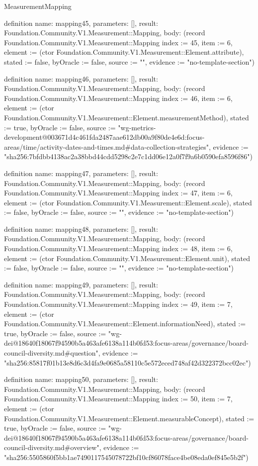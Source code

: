 \begin{lexlean}{MeasurementMapping}
\begin{semanticmodule}
definition{
  name: mapping45,
  parameters: [],
  result: Foundation.Community.V1.Measurement::Mapping,
  body: (record Foundation.Community.V1.Measurement::Mapping {index := 45, item := 6, element := (ctor Foundation.Community.V1.Measurement::Element.attribute), stated := false, byOracle := false, source := "", evidence := "no-template-section"})
}

definition{
  name: mapping46,
  parameters: [],
  result: Foundation.Community.V1.Measurement::Mapping,
  body: (record Foundation.Community.V1.Measurement::Mapping {index := 46, item := 6, element := (ctor Foundation.Community.V1.Measurement::Element.measurementMethod), stated := true, byOracle := false, source := "wg-metrics-development@003671d4c461fda2487aae612db00a9f80de4e6d:focus-areas/time/activity-dates-and-times.md#data-collection-strategies", evidence := "sha256:7bfdbb4138ac2a38bbd44cdd5298c2e7c1dd06e12a0f7f9a6b0590efa8596f86"})
}

definition{
  name: mapping47,
  parameters: [],
  result: Foundation.Community.V1.Measurement::Mapping,
  body: (record Foundation.Community.V1.Measurement::Mapping {index := 47, item := 6, element := (ctor Foundation.Community.V1.Measurement::Element.scale), stated := false, byOracle := false, source := "", evidence := "no-template-section"})
}

definition{
  name: mapping48,
  parameters: [],
  result: Foundation.Community.V1.Measurement::Mapping,
  body: (record Foundation.Community.V1.Measurement::Mapping {index := 48, item := 6, element := (ctor Foundation.Community.V1.Measurement::Element.unit), stated := false, byOracle := false, source := "", evidence := "no-template-section"})
}

definition{
  name: mapping49,
  parameters: [],
  result: Foundation.Community.V1.Measurement::Mapping,
  body: (record Foundation.Community.V1.Measurement::Mapping {index := 49, item := 7, element := (ctor Foundation.Community.V1.Measurement::Element.informationNeed), stated := true, byOracle := false, source := "wg-dei@18640f18067f94590b5a463afe6138a114b0fd53:focus-areas/governance/board-council-diversity.md#question", evidence := "sha256:85817f01b13e8d6c3d4fa9e0685a58110c5e572eced748af42d322372bcc02ec"})
}

definition{
  name: mapping50,
  parameters: [],
  result: Foundation.Community.V1.Measurement::Mapping,
  body: (record Foundation.Community.V1.Measurement::Mapping {index := 50, item := 7, element := (ctor Foundation.Community.V1.Measurement::Element.measurableConcept), stated := true, byOracle := false, source := "wg-dei@18640f18067f94590b5a463afe6138a114b0fd53:focus-areas/governance/board-council-diversity.md#overview", evidence := "sha256:5505860f5bb1ae7490117545078722bf10cf86078face4be08eda0ef845e5b2f"})
}


\end{semanticmodule}
\end{lexlean}
